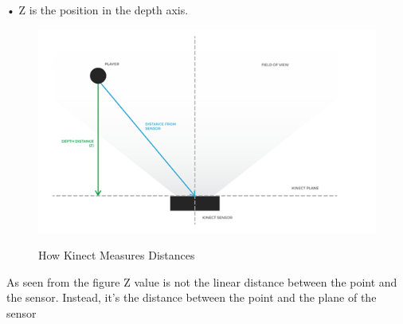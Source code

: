 •	Z is the position in the depth axis.


\begin{figure}[H]
\centering
{\includegraphics[scale=0.75]{figsensor.png}}
\caption{How Kinect Measures Distances}
\end{figure}

As seen from the figure
Z value is not the linear distance between the point and the sensor. Instead, it’s the distance between the point and the plane of the sensor



